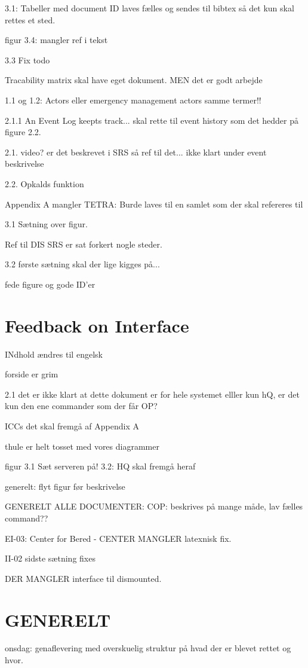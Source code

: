 3.1: Tabeller med document ID laves fælles og sendes til bibtex så det kun skal rettes et sted.

figur 3.4: mangler ref i tekst

3.3 Fix todo

Tracability matrix skal have eget dokument. MEN det er godt arbejde


1.1 og 1.2: Actors eller emergency management actors samme termer!!

2.1.1 An Event Log keepts track... skal rette til event history som det hedder  på figure 2.2.

2.1. video? er det beskrevet i SRS så ref til det... ikke klart under event beskrivelse

2.2. Opkalds funktion 

Appendix A mangler TETRA:
Burde laves til en samlet som der skal refereres til 

3.1 Sætning over figur.

Ref til DIS SRS er sat forkert nogle steder.

3.2 første sætning skal der lige kigges på...

fede figure og gode ID'er 


\section*{Feedback on Interface}
INdhold ændres til engelsk

forside er grim

2.1 det er ikke klart at dette dokument er for hele systemet elller kun hQ, er det kun den ene commander som der får OP?

ICCs det skal fremgå af Appendix A

thule er helt tosset med vores diagrammer

figur 3.1 Sæt serveren på!
3.2: HQ skal fremgå heraf

generelt: flyt figur før beskrivelse

GENERELT ALLE DOCUMENTER:
COP: beskrives på mange måde, lav fælles command??

EI-03:
Center for Bered - CENTER MANGLER latexnisk fix.


II-02
sidste sætning fixes


DER MANGLER interface til dismounted.

\section*{GENERELT}
onsdag: genaflevering med overskuelig struktur på hvad der er blevet rettet og hvor.

